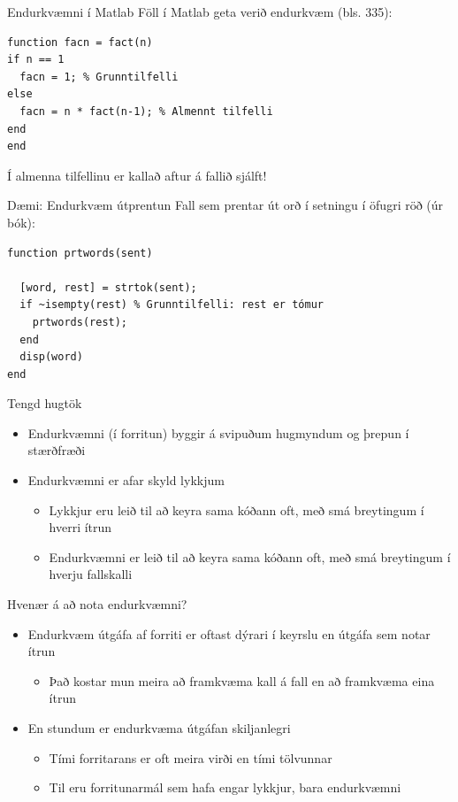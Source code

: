 \documentclass{beamer}
\begin{document}
\begin{frame}[fragile]{Endurkvæmni í Matlab}
Föll í Matlab geta verið endurkvæm (bls. 335):
\begin{verbatim}
function facn = fact(n)
if n == 1
  facn = 1; % Grunntilfelli
else
  facn = n * fact(n-1); % Almennt tilfelli
end
end
\end{verbatim}
Í almenna tilfellinu er kallað aftur á fallið sjálft!
\end{frame}

\begin{frame}[fragile]{Dæmi: Endurkvæm útprentun}
Fall sem prentar út orð í setningu í öfugri röð (úr bók):
\begin{verbatim}
function prtwords(sent)

  [word, rest] = strtok(sent);
  if ~isempty(rest) % Grunntilfelli: rest er tómur
    prtwords(rest);
  end
  disp(word)
end
\end{verbatim}
\end{frame}

\begin{frame}{Tengd hugtök}
\begin{itemize}
 \item Endurkvæmni (í forritun) byggir á svipuðum hugmyndum og þrepun í stærðfræði
 \item Endurkvæmni er afar skyld lykkjum
 \begin{itemize}
  \item Lykkjur eru leið til að keyra sama kóðann oft, með smá breytingum í hverri ítrun
  \item Endurkvæmni er leið til að keyra sama kóðann oft, með smá breytingum í hverju fallskalli
 \end{itemize}
\end{itemize}

\end{frame}

\begin{frame}{Hvenær á að nota endurkvæmni?}
\begin{itemize}
 \item Endurkvæm útgáfa af forriti er oftast dýrari í keyrslu en útgáfa sem notar ítrun
 \begin{itemize}
  \item Það kostar mun meira að framkvæma kall á fall en að framkvæma eina ítrun
 \end{itemize}
 \item En stundum er endurkvæma útgáfan skiljanlegri
 \begin{itemize}
  \item Tími forritarans er oft meira virði en tími tölvunnar
  \item Til eru forritunarmál sem hafa engar lykkjur, bara endurkvæmni
 \end{itemize}
\end{itemize}
\end{frame}
\end{document}
